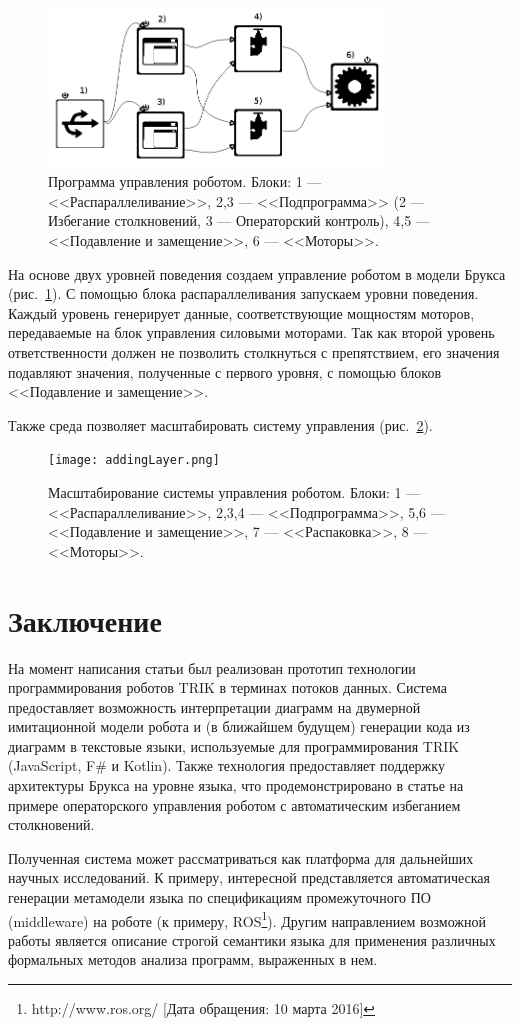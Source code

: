 \documentclass[conference]{IEEEtran}
\begin{document}
\begin{figure}[ht]
	\centering
	\includegraphics[width=3.5in]{programScreen.png}
	\caption{Программа управления роботом. Блоки: 1 --- <<Распараллеливание>>, 2,3 --- <<Подпрограмма>> (2 --- Избегание столкновений, 3 --- Операторский контроль), 4,5 --- <<Подавление и замещение>>, 6 --- <<Моторы>>.}
	\label{image:prog}
\end{figure}

На основе двух уровней поведения создаем управление роботом в модели Брукса (рис.~\ref{image:prog}). С помощью блока распараллеливания запускаем уровни поведения. Каждый уровень генерирует данные, соответствующие мощностям моторов, передаваемые на блок управления силовыми моторами. Так как второй уровень ответственности должен не позволить столкнуться с препятствием, его значения подавляют значения, полученные с первого уровня, с помощью блоков <<Подавление и замещение>>.

Также среда позволяет масштабировать систему управления (рис.~\ref{image:extension}). 
\begin{figure}[ht]
	\centering
	\texttt{[image: addingLayer.png]}
	\caption{Масштабирование системы управления роботом. Блоки: 1 --- <<Распараллеливание>>, 2,3,4 --- <<Подпрограмма>>, 5,6 --- <<Подавление и замещение>>, 7 --- <<Распаковка>>, 8 --- <<Моторы>>.}
	\label{image:extension}
\end{figure}

\section{Заключение}
\label{sec:conclusion}
На момент написания статьи был реализован прототип технологии программирования роботов TRIK в терминах потоков данных. Система предоставляет возможность интерпретации диаграмм на двумерной имитационной модели робота и (в ближайшем будущем) генерации кода из диаграмм в текстовые языки, используемые для программирования TRIK (JavaScript, F\# и Kotlin). Также технология предоставляет поддержку архитектуры Брукса на уровне языка, что продемонстрировано в статье на примере операторского управления роботом с автоматическим избеганием столкновений.

Полученная система может рассматриваться как платформа для дальнейших научных исследований. К примеру, интересной представляется автоматическая генерации метамодели языка по спецификациям промежуточного ПО (middleware) на роботе (к примеру, ROS\footnote{http://www.ros.org/ [Дата обращения: 10 марта 2016]}). Другим направлением возможной работы является описание строгой семантики языка для применения различных формальных методов анализа программ, выраженных в нем.

\newpage


\end{document}
